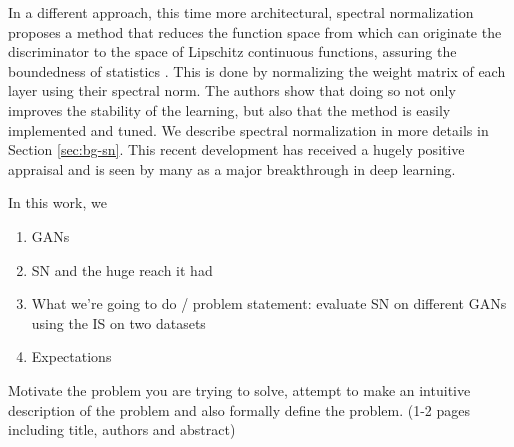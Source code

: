 In a different approach, this time more architectural, spectral normalization proposes a method that reduces the function space from which can originate the discriminator to the space of Lipschitz continuous functions, assuring the boundedness of statistics . This is done by normalizing the weight matrix of each layer using their spectral norm. The authors show that doing so not only improves the stability of the learning, but also that the method is easily implemented and tuned. We describe spectral normalization in more details in Section \ref{sec:bg-sn}. This recent development has received a hugely positive appraisal and is seen by many as a major breakthrough in deep learning.

 In this work, we 




\begin{enumerate}
	\item GANs
	\item SN and the huge reach it had
	\item What we're going to do / problem statement: evaluate SN on different GANs using the IS on two datasets
	\item Expectations
\end{enumerate}
Motivate the problem you are trying to solve, attempt to make an intuitive description of the problem and also formally define the problem. (1-2 pages including title, authors and abstract)


 


